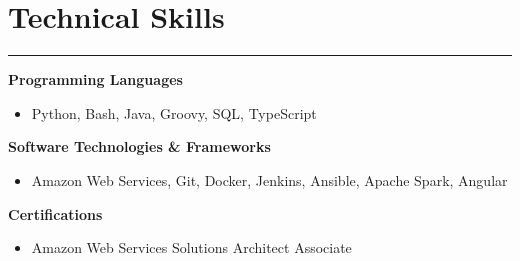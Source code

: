 \documentclass[11pt]{article}
\newcommand{\resumesection}[1]{\vspace{-0.5cm}\section*{\LARGE#1}\vspace{-0.2cm}\hrule\vspace{0.2cm}}
\begin{document}
\vspace{0.2cm}
\resumesection{Technical Skills}

\textbf{Programming Languages}
\begin{itemize}
  \item Python, Bash, Java, Groovy, SQL, TypeScript
\end{itemize}

\textbf{Software Technologies \& Frameworks}
\begin{itemize}
  \item{Amazon Web Services, Git, Docker, Jenkins, Ansible, Apache Spark, Angular}
\end{itemize}

\textbf{Certifications}
\begin{itemize}
  \item{Amazon Web Services Solutions Architect Associate}
\end{itemize}




\end{document}
